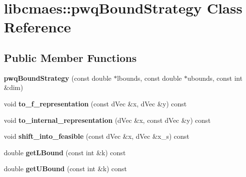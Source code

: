 \hypertarget{classlibcmaes_1_1pwqBoundStrategy}{\section{libcmaes\-:\-:pwq\-Bound\-Strategy Class Reference}
\label{classlibcmaes_1_1pwqBoundStrategy}
}
\subsection*{Public Member Functions}
\begin{DoxyCompactItemize}
\item 
\hypertarget{classlibcmaes_1_1pwqBoundStrategy_a37f4c3ff6a558e20fa6c80a5b59ce497}{{\bfseries pwq\-Bound\-Strategy} (const double $\ast$lbounds, const double $\ast$ubounds, const int \&dim)}\label{classlibcmaes_1_1pwqBoundStrategy_a37f4c3ff6a558e20fa6c80a5b59ce497}

\item 
\hypertarget{classlibcmaes_1_1pwqBoundStrategy_aebb3b92377ce6e90c34890420607c246}{void {\bfseries to\-\_\-f\-\_\-representation} (const d\-Vec \&x, d\-Vec \&y) const }\label{classlibcmaes_1_1pwqBoundStrategy_aebb3b92377ce6e90c34890420607c246}

\item 
\hypertarget{classlibcmaes_1_1pwqBoundStrategy_ab742d773ac7cd6dba47bfff7b03d213f}{void {\bfseries to\-\_\-internal\-\_\-representation} (d\-Vec \&x, const d\-Vec \&y) const }\label{classlibcmaes_1_1pwqBoundStrategy_ab742d773ac7cd6dba47bfff7b03d213f}

\item 
\hypertarget{classlibcmaes_1_1pwqBoundStrategy_a7fce5a91cf5a8f4c1b7b0743b58d4e6e}{void {\bfseries shift\-\_\-into\-\_\-feasible} (const d\-Vec \&x, d\-Vec \&x\-\_\-s) const }\label{classlibcmaes_1_1pwqBoundStrategy_a7fce5a91cf5a8f4c1b7b0743b58d4e6e}

\item 
\hypertarget{classlibcmaes_1_1pwqBoundStrategy_a8f16e0a370f358bf82517b566763b8f1}{double {\bfseries get\-L\-Bound} (const int \&k) const }\label{classlibcmaes_1_1pwqBoundStrategy_a8f16e0a370f358bf82517b566763b8f1}

\item 
\hypertarget{classlibcmaes_1_1pwqBoundStrategy_a457a0e05a886af1df39f002c1fa85995}{double {\bfseries get\-U\-Bound} (const int \&k) const }\label{classlibcmaes_1_1pwqBoundStrategy_a457a0e05a886af1df39f002c1fa85995}

\end{DoxyCompactItemize}

